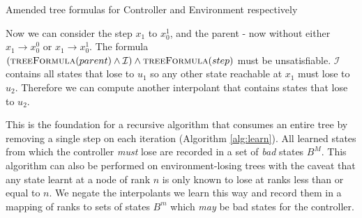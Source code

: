 \documentclass{llncs}
\newcommand{\textoverline}[1]{$\overline{\mbox{#1}}$}
\begin{document}
\begin{algorithm}
    \caption{Amended tree formulas for Controller and Environment respectively}
    \label{alg:treeFormula}
    \begin{algorithmic}[1]
        \State {}
        \Else
        \State {}
        \EndIf
        \EndFunction
    \end{algorithmic}

    \begin{algorithmic}
        \Function{\textoverline{treeFormula}}{gt}
        \State {}
        \Else
        \State {}
        \EndIf
        \EndFunction
    \end{algorithmic}
\end{algorithm}

Now we can consider the step $x_1$ to $x_0^1$, and the parent - now without
either $x_1 \to x_0^0$ or $x_1 \to x_0^1$. The formula
$(\textsc{treeFormula}(parent) \land \mathcal{I}) \land
\textsc{treeFormula}(step)$ must be unsatisfiable. $\mathcal{I}$ contains all
states that lose to $u_1$ so any other state reachable at $x_1$ must lose to
$u_2$. Therefore we can compute another interpolant that contains states that
lose to $u_2$.

This is the foundation for a recursive algorithm that consumes an entire tree
by removing a single step on each iteration (Algorithm \ref{alg:learn}). All
learned states from which the controller \emph{must} lose are recorded in a set
of \emph{bad} states $B^M$.  This algorithm can also be performed on
environment-losing trees with the caveat that any state learnt at a node of
rank $n$ is only known to lose at ranks less than or equal to $n$. We negate
the interpolants we learn this way and record them in a mapping of ranks to
sets of states $B^m$ which \emph{may} be bad states for the controller.
\end{document}
